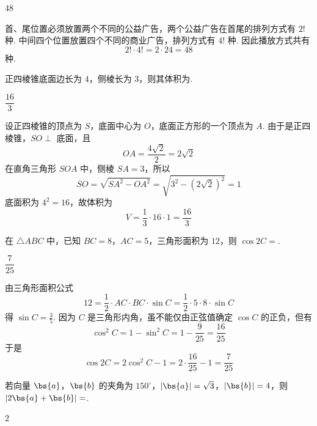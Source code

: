 \begin{answer}
\(48\)
\end{answer}

\begin{solution}
首、尾位置必须放置两个不同的公益广告，两个公益广告在首尾的排列方式有 \(2!\) 种. 中间四个位置放置四个不同的商业广告，排列方式有 \(4!\) 种. 因此播放方式共有
\[
2!\cdot4!=2\cdot24=48
\]
种.
\end{solution}

\begin{problem}
正四棱锥底面边长为 \(4\)，侧棱长为 \(3\)，则其体积为\fillinblank{}.
\end{problem}

\begin{answer}
\(\dfrac{16}{3}\)
\end{answer}

\begin{solution}
设正四棱锥的顶点为 \(S\)，底面中心为 \(O\)，底面正方形的一个顶点为 \(A\). 由于是正四棱锥，\(SO\perp\) 底面，且
\[
OA=\frac{4\sqrt2}{2}=2\sqrt2
\]
在直角三角形 \(SOA\) 中，侧棱 \(SA=3\)，所以
\[
SO=\sqrt{SA^2-OA^2}=\sqrt{3^2-(2\sqrt2)^2}=1
\]
底面积为 \(4^2=16\)，故体积为
\[
V=\frac13\cdot16\cdot1=\frac{16}{3}
\]
\end{solution}

\begin{problem}
在 \(\triangle ABC\) 中，已知 \(BC=8\)，\(AC=5\)，三角形面积为 \(12\)，则 \(\cos2C=\)\fillinblank{}.
\end{problem}

\begin{answer}
\(\dfrac{7}{25}\)
\end{answer}

\begin{solution}
由三角形面积公式
\[
12=\frac12\cdot AC\cdot BC\cdot\sin C
 =\frac12\cdot5\cdot8\cdot\sin C
\]
得 \(\sin C=\frac35\). 因为 \(C\) 是三角形内角，虽不能仅由正弦值确定 \(\cos C\) 的正负，但有
\[
\cos^2C=1-\sin^2C=1-\frac9{25}=\frac{16}{25}
\]
于是
\[
\cos2C=2\cos^2C-1=2\cdot\frac{16}{25}-1=\frac7{25}
\]
\end{solution}

\begin{problem}
若向量 \(\bs{a}\)，\(\bs{b}\) 的夹角为 \(150^\circ\)，\(|\bs{a}|=\sqrt3\)，\(|\bs{b}|=4\)，则 \(|2\bs{a}+\bs{b}|=\)\fillinblank{}.
\end{problem}

\begin{answer}
\(2\)
\end{answer}

